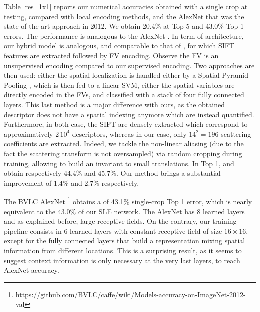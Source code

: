 \documentclass[10pt,twocolumn,letterpaper]{article}
\begin{document}
Table \ref{res_1x1} reports our numerical accuracies obtained with a single crop at testing, compared with local encoding methods, and the AlexNet that was the state-of-the-art approach in 2012. We obtain 20.4\% at Top 5 and 43.0\% Top 1 errors. The performance is analogous to the AlexNet \cite{krizhevsky2012imagenet}. In term of architecture, our hybrid model is analogous, and comparable to that of \cite{sanchez2011high,perronnin2015fisher}, for which SIFT features are extracted followed by FV \cite{sanchez2013image}  encoding. Observe the FV is an unsupervised encoding compared to our supervised encoding. Two approaches are then used: either the  spatial localization is handled either by a Spatial Pyramid Pooling \cite{lazebnik2006beyond}, which is then fed to a linear SVM, either the spatial variables are directly encoded in the FVs, and classified with a stack of four fully connected layers. This last method is a major difference with ours, as the obtained descriptor does not have a spatial indexing  anymore which are instead quantified. Furthermore, in both case, the SIFT are densely extracted which correspond to approximatively $2\,10^4$ descriptors, whereas in our case, only $14^2=196$ scattering coefficients are extracted. Indeed, we tackle the non-linear aliasing (due to the fact the scattering transform is not oversampled) via random cropping during training, allowing to build an invariant to small translations. In Top 1, \cite{sanchez2011high} and \cite{perronnin2015fisher} obtain respectively 44.4\% and 45.7\%. Our method brings a substantial improvement of 1.4\% and 2.7\% respectively.

The BVLC AlexNet \footnote{https://github.com/BVLC/caffe/wiki/Models-accuracy-on-ImageNet-2012-val} obtains a  of 43.1\%  single-crop Top 1  error, which is nearly equivalent to the 43.0\% of our SLE network. The AlexNet has 8 learned layers and as explained before, large receptive fields. On the contrary, our training pipeline consists in 6 learned layers with constant receptive field of size $16 \times 16$, except for the fully connected layers that build a  representation mixing spatial information from different locations. This is a surprising result, as it seems to suggest context information is only necessary at the very last layers, to reach AlexNet accuracy.
\end{document}
